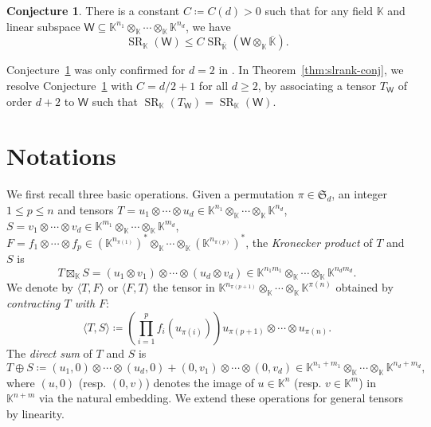 \documentclass[10pt]{article}
\theoremstyle{definition}
\newtheorem{conjecture}[theorem]{Conjecture}
\DeclareMathOperator{\sr}{SR}
\begin{document}
\setcounter{section}{1}\setcounter{theorem}{4}
\begin{conjecture}\cite[Conjecture~1.16]{adiprasito2021schmidt}\label{conj1-5}
There is a constant $C \coloneqq C (d)>0$ such that for any field $\mathbb{K}$ and linear subspace $\mathsf{W} \subseteq \mathbb{K}^{n_1} \otimes_{\mathbb{K}} \cdots \otimes_{\mathbb{K}} \mathbb{K}^{n_d}$,  we have 
\[
\sr_{\mathbb{K}}(\mathsf{W})\le C\sr_{\overline{\mathbb{K}}}(\mathsf{W} \otimes_{\mathbb{K}} \overline{\mathbb{K}}).
\]
\end{conjecture}
Conjecture~\ref{conj1-5} was only confirmed for $d = 2$ in \cite[Theorem~1.17]{adiprasito2021schmidt}.  In Theorem~\ref{thm:slrank-conj},  we resolve Conjecture~\ref{conj1-5} with $C = d/2 + 1$ for all $d \ge 2$,  by associating a tensor $T_{\mathsf{W}}$ of order $d+2$ to $\mathsf{W}$ such that $\sr_{\mathbb{K}}(T_\mathsf{W}) = \sr_{\mathbb{K}}(\mathsf{W})$. 
\setcounter{section}{1}\setcounter{equation}{0}
\section{Notations}\label{sec:prelim}
We first recall three basic operations. 
Given a permutation $\pi \in \mathfrak{S}_d$,  an integer $1 \le p \le n$ and tensors $T = u_1 \otimes \cdots \otimes u_d \in \mathbb{K}^{n_1} \otimes_{\mathbb{K}} \cdots \otimes_{\mathbb{K}} \mathbb{K}^{n_d}$,  $S = v_1 \otimes \cdots \otimes v_d \in \mathbb{K}^{m_1} \otimes_{\mathbb{K}} \cdots \otimes_{\mathbb{K}} \mathbb{K}^{m_d}$,  $F = f_{1} \otimes \cdots \otimes f_p  \in (\mathbb{K}^{n_{\pi(1)}})^\ast \otimes_{\mathbb{K}} \cdots \otimes_{\mathbb{K}} (\mathbb{K}^{n_{\pi(p)}})^\ast$,  the \emph{Kronecker product} of $T$ and $S$ is 
\[
T \boxtimes_{\mathbb{K}} S = (u_1\otimes v_1) \otimes \cdots \otimes (u_d \otimes v_d) \in \mathbb{K}^{n_1 m_1} \otimes_{\mathbb{K}} \cdots \otimes_{\mathbb{K}} \mathbb{K}^{n_d m_d}.
\]
We denote by $\langle T,  F \rangle $ or $\langle F,  T \rangle$ the tensor in $\mathbb{K}^{n_{\pi(p+1)}} \otimes_{\mathbb{K}} \cdots \otimes_{\mathbb{K}} \mathbb{K}^{\pi(n)}$ obtained by \emph{contracting $T$ with $F$}:
\[
\langle T,  S \rangle \coloneqq
\left( \prod_{i=1}^p f_i (u_{\pi(i)}) \right) u_{\pi(p+1)} \otimes \cdots \otimes u_{\pi(n)}. 
\]
The \emph{direct sum} of $T$ and $S$ is 
\[ 
T \oplus S \coloneqq (u_1,0)\otimes \cdots \otimes (u_d,0)+(0,v_1)\otimes \cdots \otimes (0,v_d) \in \mathbb{K}^{n_1 + m_1} \otimes_{\mathbb{K}} \cdots \otimes_{\mathbb{K}} \mathbb{K}^{n_d + m_d},
\]
where $(u,0)$ (resp.  $(0,v)$) denotes the image of $u \in \mathbb{K}^{n}$ (resp.  $v \in \mathbb{K}^{m}$) in $\mathbb{K}^{n + m}$ via the natural embedding. We extend these operations for general tensors by linearity.  
\end{document}
